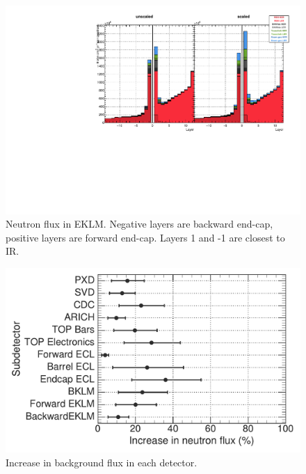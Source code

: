 \begin{figure}[htb]
	\centerfloat
		\includegraphics[width=\textwidth]{images/hEKLMFlux}
	\caption[Neutron flux in EKLM]{Neutron flux in EKLM. Negative layers are backward end-cap, positive layers are forward end-cap. Layers 1 and -1 are closest to IR.}	
	\label{fig:EKLMForFlux}
\end{figure}



\begin{figure}
	\centerfloat
		\includegraphics[width=\textwidth]{images/IncreasePlot}
	\caption[Increase in background flux in each detector]{Increase in background flux in each detector.}
	\label{fig:increasePlot}
\end{figure}




























